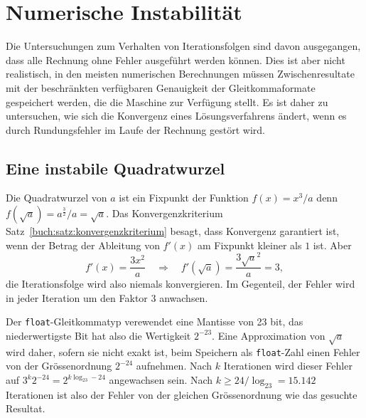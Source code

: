 %
%
%
\section{Numerische Instabilität
\label{buch:section:instabilitaet}}
Die Untersuchungen zum Verhalten von Iterationsfolgen sind davon
ausgegangen, dass alle Rechnung ohne Fehler ausgeführt werden können.
Dies ist aber nicht realistisch, in den meisten numerischen Berechnungen
müssen Zwischenresultate mit der beschränkten verfügbaren Genauigkeit
der Gleitkommaformate gespeichert werden, die die Maschine zur Verfügung
stellt.
Es ist daher zu untersuchen, wie sich die Konvergenz eines Lösungsverfahrens
ändert, wenn es durch Rundungsfehler im Laufe der Rechnung gestört wird.

\subsection{Eine instabile Quadratwurzel
\label{buch:subsection:quadratwurzel}}
Die Quadratwurzel von $a$ ist ein Fixpunkt der Funktion
$f(x)=x^3/a$ denn $f(\sqrt{a})=a^{\frac32}/a=\sqrt{a}$.
Das Konvergenzkriterium Satz~\ref{buch:satz:konvergenzkriterium} besagt,
dass Konvergenz garantiert ist, wenn der Betrag der Ableitung von $f'(x)$
am Fixpunkt kleiner als $1$ ist.
Aber
\[
f'(x) = \frac{3x^2}{a}
\quad\Rightarrow\quad
f'(\sqrt{a}) = \frac{3\sqrt{a}^2}{a}=3,
\]
die Iterationsfolge wird also niemals konvergieren.
Im Gegenteil, der Fehler wird in jeder Iteration um den Faktor $3$
anwachsen.

Der \texttt{float}-Gleitkommatyp verewendet eine Mantisse von 23 bit,
das niederwertigste Bit hat also die Wertigkeit $2^{-23}$.
Eine Approximation von $\sqrt{a}$ wird daher, sofern sie nicht
exakt ist, beim Speichern als \texttt{float}-Zahl einen Fehler
von der Grössenordnung $2^{-24}$ aufnehmen.
Nach $k$ Iterationen wird dieser Fehler auf $3^k2^{-24}=2^{k\log_23-24}$
angewachsen sein.
Nach $k\ge 24/\log_23=15.142$ Iterationen ist also der Fehler von der
gleichen Grössenordnung wie das gesuchte Resultat.

